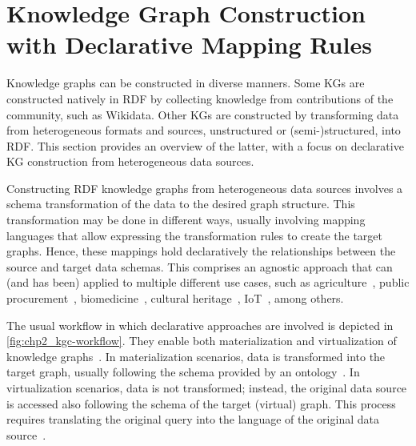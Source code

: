 \section{Knowledge Graph Construction with Declarative Mapping Rules}
\label{sec:chp2_declarative_kgc}

Knowledge graphs can be constructed in diverse manners. Some KGs are constructed natively in RDF by collecting knowledge from contributions of the community, such as Wikidata. Other KGs are constructed by transforming data from heterogeneous formats and sources, unstructured or (semi-)structured, into RDF. This section provides an overview of the latter, with a focus on declarative KG construction from heterogeneous data sources.




Constructing RDF knowledge graphs from heterogeneous data sources involves a schema transformation of the data to the desired graph structure. This transformation may be done in different ways, usually involving mapping languages that allow expressing the transformation rules to create the target graphs. Hence, these mappings hold declaratively the relationships between the source and target data schemas. This comprises an agnostic approach that can (and has been) applied to multiple different use cases, such as agriculture~\parencite{bilbao2022practical}, public procurement~\parencite{soylu2022theybuyforyou}, biomedicine~\parencite{iglesias2019bio2rdf,michel2020covid,aisopos2023knowledge}, cultural heritage~\parencite{calvanese2016culturalheritage}, IoT~\parencite{cimmino2020ewot,gonzalezgerpe2022extension}, among others.

The usual workflow in which declarative approaches are involved is depicted in \cref{fig:chp2_kgc-workflow}. They enable both materialization and virtualization of knowledge graphs~\parencite{Poggi2008}. In materialization scenarios, data is transformed into the target graph, usually following the schema provided by an ontology~\parencite{arenas2022morphkgc,iglesias2020rdfizer,Lefrancois2017sparqlgenerate}. In virtualization scenarios, data is not transformed; instead, the original data source is accessed also following the schema of the target (virtual) graph. This process requires translating the original query into the language of the original data source~\parencite{calvanese2017ontop,priyatna2014formalisation,rodriguez2015efficient}. 

